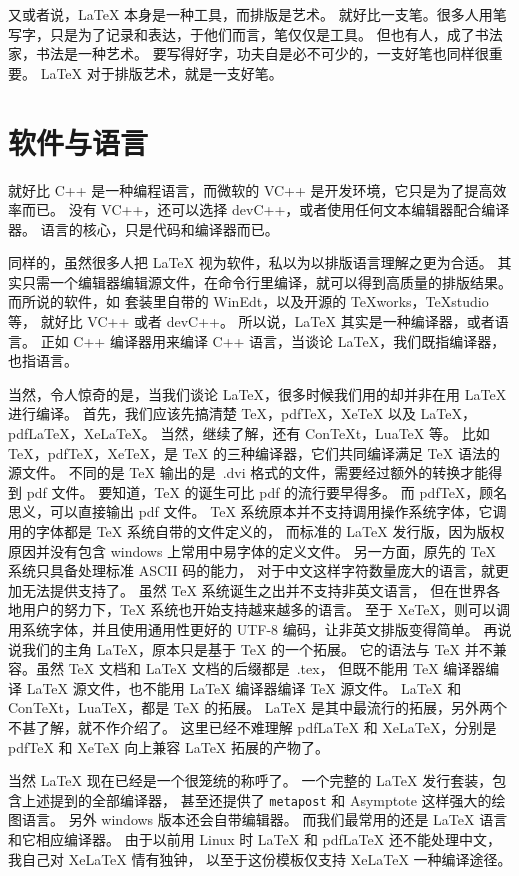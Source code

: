 又或者说，\LaTeX{} 本身是一种工具，而排版是艺术。
就好比一支笔。很多人用笔写字，只是为了记录和表达，于他们而言，笔仅仅是工具。
但也有人，成了书法家，书法是一种艺术。
要写得好字，功夫自是必不可少的，一支好笔也同样很重要。
\LaTeX{} 对于排版艺术，就是一支好笔。


\section{软件与语言}

就好比 C++ 是一种编程语言，而微软的 VC++ 是开发环境，它只是为了提高效率而已。
没有 VC++，还可以选择 devC++，或者使用任何文本编辑器配合编译器。
语言的核心，只是代码和编译器而已。

同样的，虽然很多人把 \LaTeX{} 视为软件，私以为以排版语言理解之更为合适。
其实只需一个编辑器编辑源文件，在命令行里编译，就可以得到高质量的排版结果。
而所说的软件，如 \CTeX 套装里自带的 WinEdt，以及开源的 TeXworks，TeXstudio 等，
就好比 VC++ 或者 devC++。
所以说，\LaTeX{} 其实是一种编译器，或者语言。
正如 C++ 编译器用来编译 C++ 语言，当谈论 \LaTeX{}，我们既指编译器，也指语言。

当然，令人惊奇的是，当我们谈论 \LaTeX{}，很多时候我们用的却并非在用 \LaTeX{} 进行编译。
首先，我们应该先搞清楚 TeX，pdfTeX，XeTeX 以及 LaTeX，pdfLaTeX，XeLaTeX。
当然，继续了解，还有 ConTeXt，LuaTeX 等。
比如 TeX，pdfTeX，XeTeX，是 TeX 的三种编译器，它们共同编译满足 TeX 语法的源文件。
不同的是 TeX 输出的是~.dvi 格式的文件，需要经过额外的转换才能得到 pdf 文件。
要知道，TeX 的诞生可比 pdf 的流行要早得多。
而 pdfTeX，顾名思义，可以直接输出 pdf 文件。
TeX 系统原本并不支持调用操作系统字体，它调用的字体都是 TeX 系统自带的文件定义的，
而标准的 LaTeX 发行版，因为版权原因并没有包含 windows 上常用中易字体的定义文件。
另一方面，原先的 TeX 系统只具备处理标准 ASCII 码的能力，
对于中文这样字符数量庞大的语言，就更加无法提供支持了。
虽然 TeX 系统诞生之出并不支持非英文语言，
但在世界各地用户的努力下，TeX 系统也开始支持越来越多的语言。
至于 XeTeX，则可以调用系统字体，并且使用通用性更好的 UTF-8 编码，让非英文排版变得简单。
再说说我们的主角 LaTeX，原本只是基于 TeX 的一个拓展。
它的语法与 TeX 并不兼容。虽然 TeX 文档和 LaTeX 文档的后缀都是~.tex，
但既不能用 TeX 编译器编译 LaTeX 源文件，也不能用 LaTeX 编译器编译 TeX 源文件。
LaTeX 和 ConTeXt，LuaTeX，都是 TeX 的拓展。
LaTeX 是其中最流行的拓展，另外两个不甚了解，就不作介绍了。
这里已经不难理解 pdfLaTeX 和 XeLaTeX，分别是 pdfTeX 和 XeTeX 向上兼容 LaTeX 拓展的产物了。

当然 \LaTeX{} 现在已经是一个很笼统的称呼了。
一个完整的 \LaTeX{} 发行套装，包含上述提到的全部编译器，
甚至还提供了 \texttt{metapost} 和 Asymptote 这样强大的绘图语言。
另外 windows 版本还会自带编辑器。
而我们最常用的还是 \LaTeX{} 语言和它相应编译器。
由于以前用 Linux 时 LaTeX 和 pdfLaTeX 还不能处理中文，
我自己对 XeLaTeX 情有独钟，
以至于这份模板仅支持 XeLaTeX 一种编译途径。


